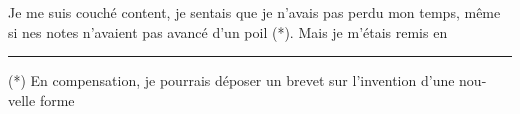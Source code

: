 Je me suis couché content, je sentais que je n'avais pas perdu mon temps, même si nes notes n'avaient pas avancé d'un poil (*). Mais je m'étais remis en
\par\noindent\rule{0.25\linewidth}{0.4pt}
(*) En compensation, je pourrais déposer un brevet sur l'invention d'une nou-\linebreak velle forme 

